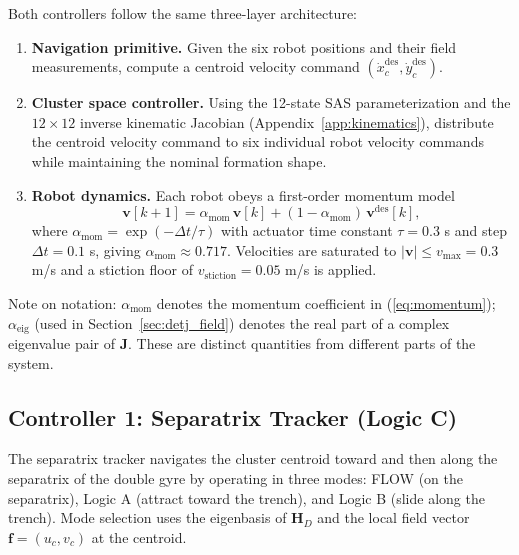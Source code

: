 \documentclass[lettersize,journal]{IEEEtran}
\begin{document}
Both controllers follow the same three-layer architecture:

\begin{enumerate}
    \item \textbf{Navigation primitive.} Given the six robot positions and their
          field measurements, compute a centroid velocity command
          $(\dot{x}_c^\text{des}, \dot{y}_c^\text{des})$.
    \item \textbf{Cluster space controller.} Using the 12-state SAS
          parameterization and the $12 \times 12$ inverse kinematic Jacobian
          (Appendix~\ref{app:kinematics}), distribute the centroid velocity
          command to six individual robot velocity commands while maintaining
          the nominal formation shape.
    \item \textbf{Robot dynamics.} Each robot obeys a first-order momentum model
          \begin{equation}
              \mathbf{v}[k+1] = \alpha_{\text{mom}}\,\mathbf{v}[k]
              + (1 - \alpha_{\text{mom}})\,\mathbf{v}^{\text{des}}[k],
              \label{eq:momentum}
          \end{equation}
          where $\alpha_{\text{mom}} = \exp(-\Delta t / \tau)$ with actuator
          time constant $\tau = 0.3$ s and step $\Delta t = 0.1$ s, giving
          $\alpha_{\text{mom}} \approx 0.717$. Velocities are saturated to
          $|\mathbf{v}| \leq v_{\max} = 0.3$ m/s and a stiction floor of
          $v_{\text{stiction}} = 0.05$ m/s is applied.
\end{enumerate}

Note on notation: $\alpha_{\text{mom}}$ denotes the momentum coefficient in
(\ref{eq:momentum}); $\alpha_{\text{eig}}$ (used in
Section~\ref{sec:detj_field}) denotes the real part of a complex eigenvalue
pair of $\mathbf{J}$. These are distinct quantities from different parts of the
system.

\subsection{Controller 1: Separatrix Tracker (Logic C)}
\label{sec:sep_controller}

The separatrix tracker navigates the cluster centroid toward and then along
the separatrix of the double gyre by operating in three modes: FLOW (on the
separatrix), Logic A (attract toward the trench), and Logic B (slide along
the trench). Mode selection uses the eigenbasis of $\mathbf{H}_D$ and the
local field vector $\mathbf{f} = (u_c, v_c)$ at the centroid.
\end{document}
